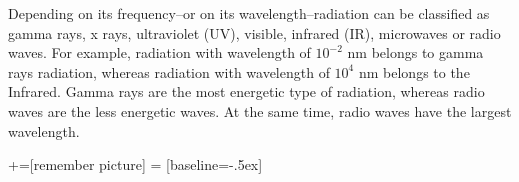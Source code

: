 \documentclass[main.tex]{subfiles}
\newcommand\chapterlabel{electrons}
\begin{document}
\begin{description}
\begin{minipage}[b]{1.5\linewidth}
\end{minipage}



\item[\docfilehook{Types and color of radiation}{}] 
Depending on its frequency--or on its wavelength--radiation can be classified as gamma rays, x rays, ultraviolet (UV), visible, infrared (IR), microwaves or radio waves. For example, radiation with wavelength of $10^{-2}$ nm belongs to gamma rays radiation, whereas radiation with wavelength of $10^{4}$ nm belongs to the Infrared. Gamma rays are the most energetic type of radiation, whereas radio waves are the less energetic waves. At the same time, radio waves have the largest wavelength.



+=[remember picture]
 = [baseline=-.5ex]
     \label{Fig:{\chapterlabel}\thefigurenewcounter} \begin{center}
\begin{tikzpicture}[fill between/on layer={axis grid}, line width=1pt, xscale=1,yscale=1, every node/.style={scale=0.9}]



\end{tikzpicture}
\end{center}
\end{description}
\end{document}
